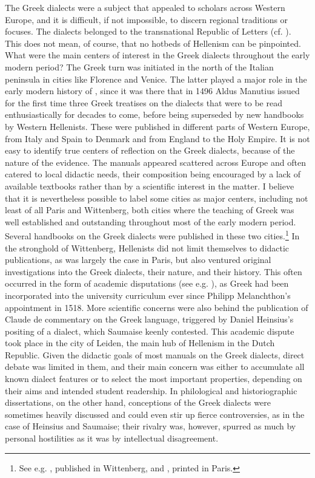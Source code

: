 The Greek dialects were a subject that appealed to scholars across Western Europe, and it is difficult, if not impossible, to discern regional traditions or focuses. The dialects belonged to the transnational Republic of Letters (cf. \citealt{Bots1997}). This does not mean, of course, that no hotbeds of Hellenism can be pinpointed. What were the main centers of interest in the Greek dialects throughout the early modern period? The Greek turn was initiated in the north of the Italian peninsula in cities like Florence and Venice. The latter played a major role in the early modern history of  , since it was there that in 1496 Aldus Manutius issued for the first time three Greek treatises on the dialects that were to be read enthusiastically for decades to come, before being superseded by new handbooks by Western Hellenists. These were published in different parts of Western Europe, from Italy and Spain to Denmark and from England to the Holy  Empire. It is not easy to identify true centers of reflection on the Greek dialects, because of the nature of the evidence. The manuals appeared scattered across Europe and often catered to local didactic needs, their composition being encouraged by a lack of available textbooks rather than by a scientific interest in the matter. I believe that it is nevertheless possible to label some cities as major centers, including not least of all Paris and Wittenberg, both cities where the teaching of Greek was well established and outstanding throughout most of the early modern period. Several handbooks on the Greek dialects were published in these two cities.\footnote{See e.g. \citet{Schmidt1604}, published in Wittenberg, and \citet{Merigon1621}, printed in Paris.} In the  stronghold of Wittenberg, Hellenists did not limit themselves to didactic publications, as was largely the case in Paris, but also ventured original investigations into the Greek dialects, their nature, and their history. This often occurred in the form of academic disputations (see e.g. \citealt{Thryllitsch1709}), as Greek had been incorporated into the university curriculum ever since Philipp Melanchthon’s appointment in 1518. More scientific concerns were also behind the publication of Claude de  commentary on the Greek language, triggered by Daniel Heinsius’s positing of a  dialect, which Saumaise keenly contested. This academic dispute took place in the city of Leiden, the main hub of Hellenism in the Dutch Republic. Given the didactic goals of most manuals on the Greek dialects, direct debate was limited in them, and their main concern was either to accumulate all known dialect features or to select the most important properties, depending on their aims and intended student readership. In philological and historiographic dissertations, on the other hand, conceptions of the Greek dialects were sometimes heavily discussed and could even stir up fierce controversies, as in the case of Heinsius and Saumaise; their rivalry was, however, spurred as much by personal hostilities as it was by intellectual disagreement.

